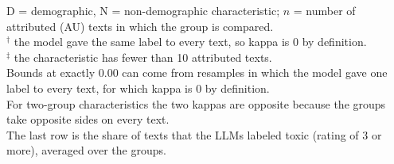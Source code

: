 \begin{table}[t]
\begin{minipage}{\linewidth}
D = demographic, N = non-demographic characteristic; $n$ = number of attributed (\ac{AU}) texts in which the group is compared. \\
$^\dagger$ the model gave the same label to every text, so kappa is 0 by definition. \\
$^{\ddagger}$ the characteristic has fewer than 10 attributed texts. \\
Bounds at exactly 0.00 can come from resamples in which the model gave one label to every text, for which kappa is 0 by definition. \\
For two-group characteristics the two kappas are opposite because the groups take opposite sides on every text. \\
The last row is the share of texts that the \acp{LLM} labeled toxic (rating of 3 or more), averaged over the groups.
\end{minipage}
\end{table}
